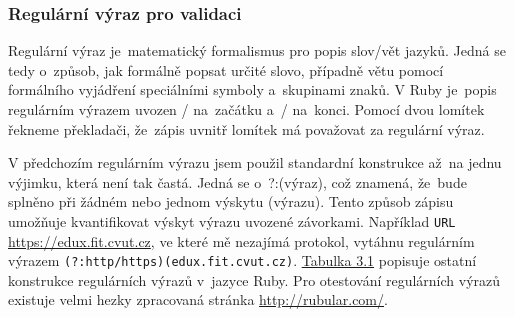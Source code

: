 \subsubsection{Regulární výraz pro validaci}
\par Regulární výraz\cite{regexp} je~matematický formalismus pro popis slov/vět jazyků. Jedná se tedy o~způsob, jak formálně popsat určité slovo, případně větu pomocí formálního vyjádření speciálními symboly a~skupinami znaků. V Ruby\cite{ruby} je~popis regulárním výrazem uvozen / na~začátku a~/ na~konci. Pomocí dvou lomítek řekneme překladači, že~zápis uvnitř lomítek má považovat za regulární výraz.
\par V předchozím regulárním výrazu jsem použil standardní konstrukce až~na jednu výjimku, která není tak častá. Jedná se o~?:(výraz), což znamená, že~bude splněno při žádném nebo jednom výskytu (výrazu). Tento způsob zápisu umožňuje kvantifikovat výskyt výrazu uvozené závorkami. Například \texttt{URL} \url{https://edux.fit.cvut.cz}, ve které mě nezajímá protokol, vytáhnu regulárním výrazem \texttt{(?:http/https)(edux.fit.cvut.cz)}. \hyperlink{regtable}{Tabulka 3.1} popisuje ostatní konstrukce regulárních výrazů v~jazyce Ruby. Pro otestování regulárních výrazů existuje velmi hezky zpracovaná stránka \url{http://rubular.com/}\cite{michaellovitt}.

